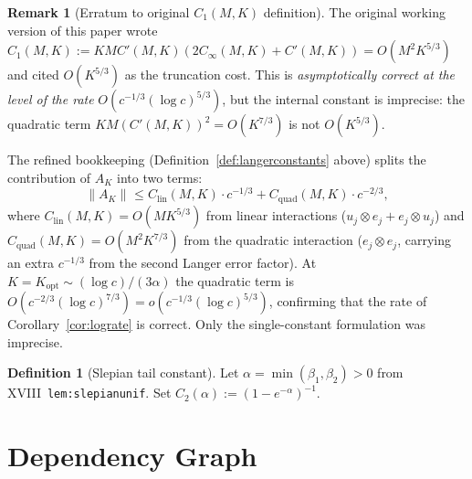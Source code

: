 \documentclass[12pt,a4paper]{amsart}
\theoremstyle{definition}
\newtheorem{definition}[theorem]{Definition}
\newtheorem{remark}[theorem]{Remark}
\newcommand{\normh}[2]{\|#1\|_{#2}}
\newcommand{\Cprime}{C'(M,K)}
\newcommand{\Clin}{C_{\mathrm{lin}}(M,K)}
\newcommand{\Cquad}{C_{\mathrm{quad}}(M,K)}
\newcommand{\Ctwo}{C_2(\alpha)}
\newcommand{\Kopt}{K_{\mathrm{opt}}}
\newcommand{\AK}{A_K}
\newcommand{\Cinfty}{C_\infty(M,K)}
\begin{document}
\begin{remark}[Erratum to original $C_1(M,K)$ definition]
\label{rem:C1scale}
The original working version of this paper wrote
$C_1(M,K) := KM\Cprime(2\Cinfty+\Cprime) = O(M^2K^{5/3})$
and cited $O(K^{5/3})$ as the truncation cost.
This is \emph{asymptotically correct at the level of the rate}
$O(c^{-1/3}(\log c)^{5/3})$,
but the internal constant is imprecise:
the quadratic term $KM(\Cprime)^2 = O(K^{7/3})$
is not $O(K^{5/3})$.

The refined bookkeeping (Definition~\ref{def:langerconstants} above)
splits the contribution of $\AK$ into two terms:
\[
  \normh{\AK}{} \leq \Clin\cdot c^{-1/3} + \Cquad\cdot c^{-2/3},
\]
where $\Clin = O(MK^{5/3})$ from linear interactions
($u_j \otimes e_j + e_j \otimes u_j$)
and $\Cquad = O(M^2K^{7/3})$ from the quadratic interaction
($e_j \otimes e_j$, carrying an extra $c^{-1/3}$ from the
second Langer error factor).
At $K = \Kopt \sim (\log c)/(3\alpha)$ the quadratic term is
$O(c^{-2/3}(\log c)^{7/3}) = o(c^{-1/3}(\log c)^{5/3})$,
confirming that the rate of Corollary~\ref{cor:lograte}
is correct. Only the single-constant formulation was imprecise.
\end{remark}

\begin{definition}[Slepian tail constant]
\label{def:C2}
Let $\alpha = \min(\beta_1,\beta_2) > 0$ from XVIII~\texttt{lem:slepianunif}.
Set $\Ctwo := (1-e^{-\alpha})^{-1}$.
\end{definition}

\section{Dependency Graph}
\label{sec:depgraph}
\end{document}
